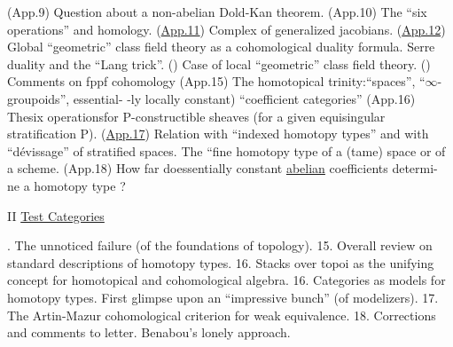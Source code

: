 (App.9)  Question about a non-abelian Dold-Kan theorem.
(App.10) The ``six operations'' and homology.
(\uline{App.11}) Complex of generalized jacobians.
(\uline{App.12}) Global ``geometric'' class field theory as a cohomological
duality formula. Serre duality and the ``Lang trick''.
() Case of local ``geometric'' class field theory.
() Comments on fppf cohomology   
(App.15) The homotopical trinity:\hand{(}``spaces'', ``$\infty$-groupoids'', \hand{(}essential-%
-ly locally constant) ``coefficient categories''
(App.16) Thesix operationsfor P-constructible sheaves (for a given
equisingular stratification P).
(\uline{App.17}) Relation with ``indexed homotopy types'' and with ``dévissage''
of stratified spaces. The ``fine homotopy type of a (tame)
space or of a scheme.
(App.18) How far doessentially constant \uline{abelian} coefficients determi-%
ne a homotopy type ?

II \uline{Test Categories}

. The unnoticed failure (of the foundations of topology).
15. Overall review on standard descriptions of homotopy types.
16. Stacks over topoi as the unifying concept for homotopical and
cohomological algebra.
16. Categories as models for homotopy types. First glimpse upon an
``impressive bunch'' (of modelizers).
17. The Artin-Mazur cohomological criterion for weak equivalence.
18. Corrections and comments to letter. Benabou's lonely approach.


